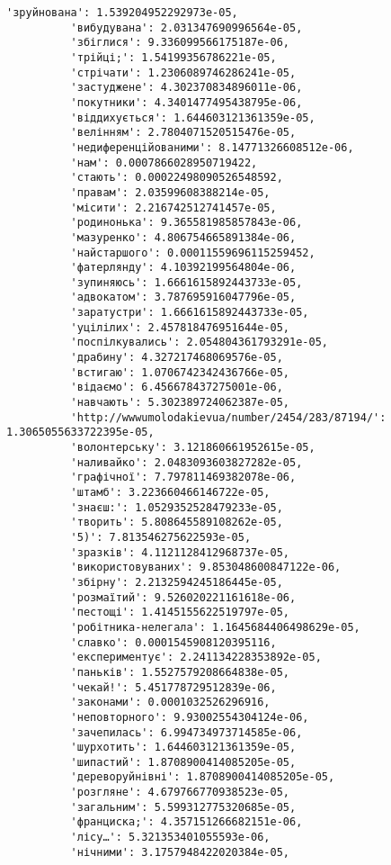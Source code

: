 \documentclass[11pt]{article}
\begin{document}
\begin{Verbatim}[commandchars=\\\{\}]
          'зруйнована': 1.539204952292973e-05,
          'вибудувана': 2.031347690996564e-05,
          'збіглися': 9.336099566175187e-06,
          'трійці;': 1.54199356786221e-05,
          'стрічати': 1.2306089746286241e-05,
          'застуджене': 4.302370834896011e-06,
          'покутники': 4.3401477495438795e-06,
          'віддихується': 1.644603121361359e-05,
          'велінням': 2.7804071520515476e-05,
          'недиференційованими': 8.14771326608512e-06,
          'нам': 0.0007866028950719422,
          'стають': 0.00022498090526548592,
          'правам': 2.03599608388214e-05,
          'місити': 2.216742512741457e-05,
          'родинонька': 9.365581985857843e-06,
          'мазуренко': 4.806754665891384e-06,
          'найстаршого': 0.00011559696115259452,
          'фатерлянду': 4.10392199564804e-06,
          'зупиняюсь': 1.6661615892443733e-05,
          'адвокатом': 3.787695916047796e-05,
          'заратустри': 1.6661615892443733e-05,
          'уцілілих': 2.457818476951644e-05,
          'поспілкувались': 2.054804361793291e-05,
          'драбину': 4.327217468069576e-05,
          'встигаю': 1.0706742342436766e-05,
          'відаємо': 6.456678437275001e-06,
          'навчають': 5.302389724062387e-05,
          'http://wwwumolodakievua/number/2454/283/87194/': 1.3065055633722395e-05,
          'волонтерську': 3.121860661952615e-05,
          'наливайко': 2.0483093603827282e-05,
          'графічної': 7.797811469382078e-06,
          'штамб': 3.223660466146722e-05,
          'знаєш:': 1.0529352528479233e-05,
          'творить': 5.808645589108262e-05,
          '5)': 7.813546275622593e-05,
          'зразків': 4.1121128412968737e-05,
          'використовуваних': 9.853048600847122e-06,
          'збірну': 2.2132594245186445e-05,
          'розмаїтий': 9.526020221161618e-06,
          'пестощі': 1.4145155622519797e-05,
          'робітника-нелегала': 1.1645684406498629e-05,
          'славко': 0.0001545908120395116,
          'експериментує': 2.241134228353892e-05,
          'паньків': 1.5527579208664838e-05,
          'чекай!': 5.451778729512839e-06,
          'законами': 0.0001032526296916,
          'неповторного': 9.93002554304124e-06,
          'зачепилась': 6.994734973714585e-06,
          'шурхотить': 1.644603121361359e-05,
          'шипастий': 1.8708900414085205e-05,
          'дереворуйнівні': 1.8708900414085205e-05,
          'розгляне': 4.679766770938523e-05,
          'загальним': 5.599312775320685e-05,
          'франциска;': 4.357151266682151e-06,
          'лісу…': 5.321353401055593e-06,
          'нічними': 3.1757948422020384e-05,

\end{Verbatim}
\end{document}
